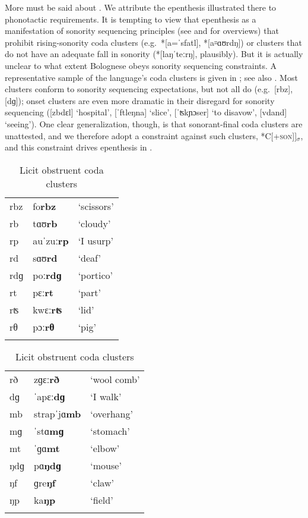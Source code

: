 \documentclass[output=paper,colorlinks,citecolor=brown]{langscibook}
\begin{document}
More must be said about .  We attribute the epenthesis illustrated there to phonotactic requirements.  It is tempting to view that epenthesis as a manifestation of sonority sequencing principles (see \cite{selkirk:majorclassfeatures} and \cite{sonoritycycle} for overviews) that prohibit rising-sonority coda clusters (e.g.\ *[a=ˈsfatl], *[a꞊ɑʊrdŋ]) or clusters that do not have an adequate fall in sonority (*[laŋˈteːrŋ], plausibly).  But it is actually unclear to what extent Bolognese obeys sonority sequencing constraints.  A representative sample of the language's coda clusters is given in ; see also .  Most clusters conform to sonority sequencing expectations, but not all do (e.g.\ [rbz], [dɡ]); onset clusters are even more dramatic in their disregard for sonority sequencing ([zbdɛl] `hospital', [ˈftleŋna] `slice', [ˈʦkɲɔser] `to disavow', [vdand] `seeing').  One clear generalization, though, is that sonorant-final coda clusters are unattested, and we therefore adopt a constraint against such clusters, *C[+\textsc{son}]]$_\sigma$, and this constraint drives epenthesis in .

\begin{table}
\caption{Licit obstruent coda clusters}
\label{obstruentclusters} 
\begin{minipage}{.5\textwidth}
\begin{tabular}{lll}
\lsptoprule
rbz & fo\textbf{rbz} & `scissors' \\
rb & tɑʊ\textbf{rb} & `cloudy' \\
rp & auˈzuː\textbf{rp} & `I usurp' \\
rd & sɑʊ\textbf{rd} & `deaf' \\
rdɡ & poː\textbf{rdɡ} & `portico' \\
rt & pɛː\textbf{rt} & `part' \\
rʦ & kwɛː\textbf{rʦ} & `lid' \\
rθ & pɔː\textbf{rθ} & `pig'\\
\lspbottomrule
\end{tabular}
\end{minipage}%
\begin{minipage}{.5\textwidth}
\begin{tabular}[t]{lll}
\lsptoprule
rð & zɡɛː\textbf{rð} & `wool comb' \\
dɡ & ˈapɛː\textbf{dɡ} & `I walk' \\
mb & strapˈjɑ\textbf{mb} & `overhang' \\
mɡ &ˈstɑ\textbf{mɡ} & `stomach' \\
mt &ˈɡɑ\textbf{mt} & `elbow' \\
ŋdɡ & pɑ\textbf{ŋdɡ} & `mouse'\\
ŋf & ɡre\textbf{ŋf} & `claw'\\
ŋp & ka\textbf{ŋp} & `field'\\
\lspbottomrule
\end{tabular}
\end{minipage}
\end{table}
\end{document}
